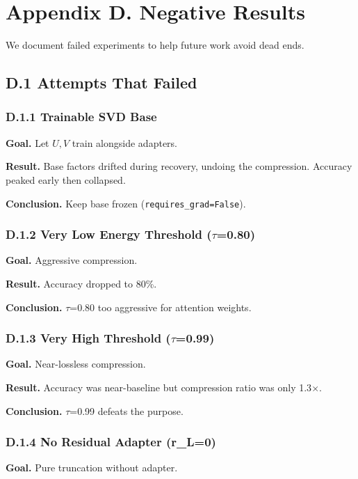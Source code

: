 
\section{Appendix D. Negative Results}

We document failed experiments to help future work avoid dead ends.

\subsection{D.1 Attempts That Failed}

\subsubsection{D.1.1 Trainable SVD Base}

\textbf{Goal.} Let $U, V$ train alongside adapters.

\textbf{Result.} Base factors drifted during recovery, undoing the compression. 
Accuracy peaked early then collapsed.

\textbf{Conclusion.} Keep base frozen (\texttt{requires\_grad=False}).

\subsubsection{D.1.2 Very Low Energy Threshold ($\tau$=0.80)}

\textbf{Goal.} Aggressive compression.

\textbf{Result.} Accuracy dropped to 80\%.

\textbf{Conclusion.} $\tau$=0.80 too aggressive for attention weights.

\subsubsection{D.1.3 Very High Threshold ($\tau$=0.99)}

\textbf{Goal.} Near-lossless compression.

\textbf{Result.} Accuracy was near-baseline but compression ratio was only 
1.3$\times$.

\textbf{Conclusion.} $\tau$=0.99 defeats the purpose.

\subsubsection{D.1.4 No Residual Adapter (r\_L=0)}

\textbf{Goal.} Pure truncation without adapter.

